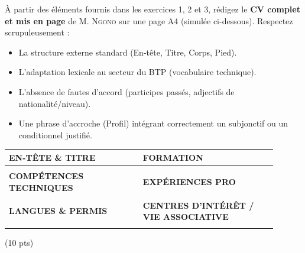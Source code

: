 \documentclass[11pt]{article}
\begin{document}
\begin{exercice}
À partir des éléments fournis dans les exercices 1, 2 et 3, rédigez le \textbf{CV complet et mis en page} de M. \textsc{Ngono} sur une page A4 (simulée ci-dessous). Respectez scrupuleusement :
\begin{itemize}
    \item La structure externe standard (En-tête, Titre, Corps, Pied).
    \item L'adaptation lexicale au secteur du BTP (vocabulaire technique).
    \item L'absence de fautes d'accord (participes passés, adjectifs de nationalité/niveau).
    \item Une phrase d'accroche (Profil) intégrant correctement un subjonctif ou un conditionnel justifié.
\end{itemize}
\begin{center}
\begin{tabular}{|p{0.45\linewidth}|p{0.45\linewidth}|}
\hline
\textbf{EN-TÊTE \& TITRE} & \textbf{FORMATION} \\ \hline
\vspace{3cm} & \vspace{3cm} \\ \hline
\textbf{COMPÉTENCES TECHNIQUES} & \textbf{EXPÉRIENCES PRO} \\ \hline
\vspace{3cm} & \vspace{3cm} \\ \hline
\textbf{LANGUES \& PERMIS} & \textbf{CENTRES D'INTÉRÊT / VIE ASSOCIATIVE} \\ \hline
\vspace{2cm} & \vspace{2cm} \\ \hline
\end{tabular}
\end{center}
\hfill (10 pts)
\end{exercice}
\end{document}
